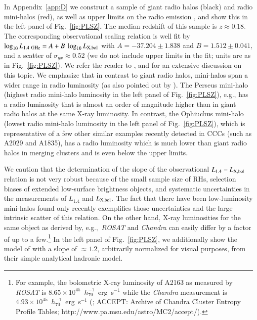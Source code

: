 \documentclass[useAMS,usenatbib]{mn2e}
\begin{document}
In Appendix~\ref{app:D} we construct a sample of giant radio halos (black) and
radio mini-halos (red), as well as upper limits on the radio emission
\citep{2009A&A...499..371G,2009A&A...507..661B, 2011A&A...527A..99E}, and show
this in the left panel of Fig.~\ref{fig:PLSZ}. The median redshift of this
sample is $z\approx0.18$. The corresponding observational scaling relation is
well fit by $\log_{10} L_{1.4~{\mathrm{GHz}}} = A + B~\log_{10} L_{{\mathrm{X,bol}}}$ with
$A=-37.204\pm1.838$ and $B=1.512\pm0.041$, and a scatter of $\sigma_{yx} \approx
0.52$ (we do not include upper limits in the fit; units are as in
Fig.~\ref{fig:PLSZ}). We refer the reader to \cite{2009A&A...507..661B}, 
\cite{2011A&A...527A..99E} and \cite{2013arXiv1306.4379C} for an extensive discussion on this topic. 
We emphasize that in contrast to giant radio halos, mini-halos span a wider range
in radio luminosity (as also pointed out by \citealp{2009A&A...499..679M}). The
Perseus mini-halo (highest radio mini-halo luminosity in the left panel of
Fig.~\ref{fig:PLSZ}), e.g., has a radio luminosity that is almost an order of
magnitude higher than in giant radio halos at the same X-ray luminosity. In
contrast, the Ophiuchus mini-halo (lowest radio mini-halo luminosity in the left
panel of Fig.~\ref{fig:PLSZ}), which is representative of a few other similar
examples recently detected in CCCs (such as A2029 and A1835), has a radio
luminosity which is much lower than giant radio halos in merging clusters and is
even below the upper limits.

We caution that the determination of the slope of the observational
$L_{1.4}-L_{{\mathrm{X,bol}}}$ relation is not very robust because of the small
sample size of RHs, selection biases of extended low-surface brightness objects,
and systematic uncertainties in the measurements of $L_{1.4}$ and
$L_{{\mathrm{X,bol}}}$. The fact that there have been low-luminosity mini-halos found
only recently \citep{Giacintucci} exemplifies those uncertainties and the large
intrinsic scatter of this relation. On the other hand, X-ray luminosities for
the same object as derived by, e.g.,~\emph{ROSAT} and \emph{Chandra} can easily
differ by a factor of up to a few.\footnote{For example, the bolometric X-ray
  luminosity of A2163 as measured by \emph{ROSAT} is
  $8.65\times10^{45}$~$h_{70}^{-1}$~erg~s$^{-1}$ \citep{2009A&A...507..661B}
  while the \emph{Chandra} measurement is
  $4.93\times10^{45}$~$h_{70}^{-1}$~erg~s$^{-1}$ (\citealp{2009ApJS..182...12C};
  ACCEPT: Archive of Chandra Cluster Entropy Profile Tables;
  http://www.pa.msu.edu/astro/MC2/accept/).}  In the left panel of
Fig.~\ref{fig:PLSZ}, we additionally show the model of
\citet{2009JCAP...09..024K} with a slope of $\approx1.2$, arbitrarily normalized
for visual purposes, from their simple analytical hadronic model.
\end{document}
